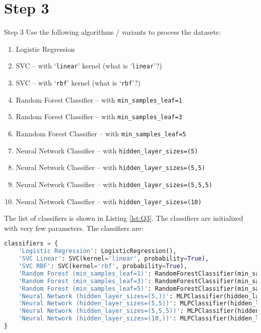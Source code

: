 \section*{Step 3}

\begin{custombox}[label={box:Q3}]{Step 3}
	Use the following algorithms / variants to process the datasets:
    \begin{enumerate}[label=\alph*)]
        \item Logistic Regression
        \item SVC – with `\texttt{linear}' kernel (what is `\texttt{linear}'?)
        \item SVC – with `\texttt{rbf}’ kernel (what is `\texttt{rbf}'?)
        \item Random Forest Classifier – with \texttt{min\_samples\_leaf=1}
        \item Random Forest Classifier – with \texttt{min\_samples\_leaf=3}
        \item Ranndom Forest Classifier – with \texttt{min\_samples\_leaf=5}
        \item Neural Network Classifier – with \texttt{hidden\_layer\_sizes=(5)}
        \item Neural Network Classifier – with \texttt{hidden\_layer\_sizes=(5,5)}
        \item Neural Network Classifier – with \texttt{hidden\_layer\_sizes=(5,5,5)}
        \item Neural Network Classifier – with \texttt{hidden\_layer\_sizes=(10)}
    \end{enumerate}
\end{custombox}

\vspace{10mm}

The list of classifiers is shown in Listing \ref{lst:Q3}. The classifiers are initialized with very few parameters. The classifiers are:

\begin{lstlisting}[language=Python, caption=List of Classifiers, label={lst:Q2}]
classifiers = {
    'Logistic Regression': LogisticRegression(),
    'SVC Linear': SVC(kernel='linear', probability=True),
    'SVC RBF': SVC(kernel='rbf', probability=True),
    'Random Forest (min_samples_leaf=1)': RandomForestClassifier(min_samples_leaf=1),
    'Random Forest (min_samples_leaf=3)': RandomForestClassifier(min_samples_leaf=3),
    'Random Forest (min_samples_leaf=5)': RandomForestClassifier(min_samples_leaf=5),
    'Neural Network (hidden_layer_sizes=(5,))': MLPClassifier(hidden_layer_sizes=(5,)),
    'Neural Network (hidden_layer_sizes=(5,5))': MLPClassifier(hidden_layer_sizes=(5,5)),
    'Neural Network (hidden_layer_sizes=(5,5,5))': MLPClassifier(hidden_layer_sizes=(5,5,5)),
    'Neural Network (hidden_layer_sizes=(10,))': MLPClassifier(hidden_layer_sizes=(10,))
}
\end{lstlisting}

